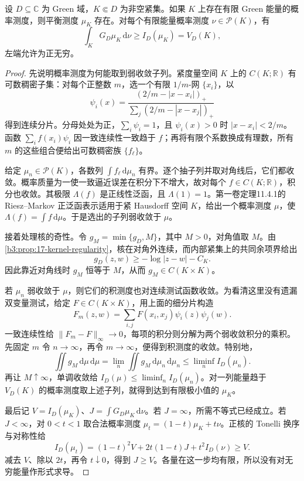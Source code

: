 \begin{theorem}[平衡测度的存在与变分条件]\label{b3:thm:17-equilibrium-existence}
设 \(D\subseteq\mathbb C\) 为 Green 域，\(K\Subset D\) 为非空紧集。如果 \(K\) 上存在有限 Green 能量的概率测度，则平衡测度 \(\mu_K\) 存在。对每个有限能量概率测度 \(\nu\in\mathcal P(K)\)，有
\begin{equation}\label{b3:eq:17-equilibrium-variation}
 \int_KG_D\mu_K\,\mathrm d\nu\ge I_D(\mu_K)=V_D(K),
\end{equation}
左端允许为正无穷。
\end{theorem}
\begin{proof}
先说明概率测度为何能取到弱收敛子列。紧度量空间 \(K\) 上的 \(C(K;\mathbb R)\) 有可数稠密子集：对每个正整数 \(m\)，选一个有限 \(1/m\)-网 \(\{x_i\}\)，以
\[
 \psi_i(x)=\frac{(2/m-|x-x_i|)_+}{\sum_j(2/m-|x-x_j|)_+}
\]
得到连续分片。分母处处为正，\(\sum_i\psi_i=1\)，且 \(\psi_i(x)>0\) 时 \(|x-x_i|<2/m\)。函数 \(\sum_i f(x_i)\psi_i\) 因一致连续性一致趋于 \(f\)；再将有限个系数换成有理数，所有 \(m\) 的这些组合便给出可数稠密族 \(\{f_\ell\}\)。

给定 \(\mu_n\in\mathcal P(K)\)，各数列 \(\int f_\ell\,\mathrm d\mu_n\) 有界。逐个抽子列并取对角线后，它们都收敛。概率质量为一使一致逼近误差在积分下不增大，故对每个 \(f\in C(K;\mathbb R)\)，积分也收敛。其极限 \(\Lambda(f)\) 是正线性泛函，且 \(\Lambda(1)=1\)。第一卷定理11.4.1的 Riesz--Markov 正泛函表示适用于紧 Hausdorff 空间 \(K\)，给出一个概率测度 \(\mu\)，使 \(\Lambda(f)=\int f\,\mathrm d\mu\)。于是选出的子列弱收敛于 \(\mu\)。

接着处理核的奇性。令 \(g_M=\min\{g_D,M\}\)，其中 \(M>0\)，对角值取 \(M\)。由\cref{b3:prop:17-kernel-regularity}，核在对角外连续，而内部紧集上的共同余项界给出
\[
 g_D(z,w)\ge-\log|z-w|-C_K.
\]
因此靠近对角线时 \(g_M\) 恒等于 \(M\)，从而 \(g_M\in C(K\times K)\)。

若 \(\mu_n\) 弱收敛于 \(\mu\)，则它们的积测度也对连续测试函数收敛。为看清这里没有遗漏双变量测试，给定 \(F\in C(K\times K)\)，用上面的细分片构造
\[
 F_m(z,w)=\sum_{i,j}F(x_i,x_j)\psi_i(z)\psi_j(w).
\]
一致连续性给 \(\|F_m-F\|_\infty\to0\)，每项的积分则分解为两个弱收敛积分的乘积。先固定 \(m\) 令 \(n\to\infty\)，再令 \(m\to\infty\)，便得到积测度的收敛。特别地，
\[
 \iint g_M\,\mathrm d\mu\,\mathrm d\mu
 =\lim_n\iint g_M\,\mathrm d\mu_n\,\mathrm d\mu_n
 \le\liminf_n I_D(\mu_n).
\]
再让 \(M\uparrow\infty\)，单调收敛给 \(I_D(\mu)\le\liminf_n I_D(\mu_n)\)。对一列能量趋于 \(V_D(K)\) 的概率测度取上述子列，就得到达到有限极小值的 \(\mu_K\)。

最后记 \(V=I_D(\mu_K)\)、\(J=\int G_D\mu_K\,\mathrm d\nu\)。若 \(J=\infty\)，所需不等式已经成立。若 \(J<\infty\)，对 \(0<t<1\) 取合法概率测度 \(\mu_t=(1-t)\mu_K+t\nu\)。正核的 Tonelli 换序与对称性给
\[
 I_D(\mu_t)=(1-t)^2V+2t(1-t)J+t^2I_D(\nu)\ge V.
\]
减去 \(V\)、除以 \(2t\)，再令 \(t\downarrow0\)，得到 \(J\ge V\)。各量在这一步均有限，所以没有对无穷能量作形式求导。
\end{proof}

